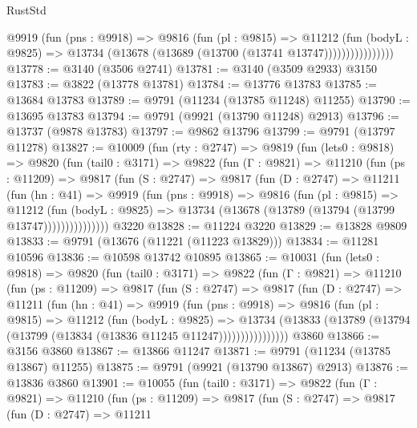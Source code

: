 \begin{lexlean}{RustStd}
\begin{coremodule}
                    @9919
                      (fun (pns : @9918) =>
                      @9816
                        (fun (pl : @9815) =>
                        @11212
                          (fun (bodyL : @9825) =>
                          @13734 (@13678 (@13689 (@13700 (@13741 @13747))))))))))))))))
@13778 := @3140 (@3506 @2741)
@13781 := @3140 (@3509 @2933) @3150
@13783 := @3822 (@13778 @13781)
@13784 := @13776 @13783
@13785 := @13684 @13783
@13789 := @9791 (@11234 (@13785 @11248) @11255)
@13790 := @13695 @13783
@13794 := @9791 (@9921 (@13790 @11248) @2913)
@13796 := @13737 (@9878 @13783)
@13797 := @9862 @13796
@13799 := @9791 (@13797 @11278)
@13827 := @10009
    (fun (rty : @2747) =>
    @9819
      (fun (lets0 : @9818) =>
      @9820
        (fun (tail0 : @3171) =>
        @9822
          (fun (Γ : @9821) =>
          @11210
            (fun (ps : @11209) =>
            @9817
              (fun (S : @2747) =>
              @9817
                (fun (D : @2747) =>
                @11211
                  (fun (hn : @41) =>
                  @9919
                    (fun (pns : @9918) =>
                    @9816
                      (fun (pl : @9815) =>
                      @11212
                        (fun (bodyL : @9825) =>
                        @13734 (@13678 (@13789 (@13794 (@13799 @13747)))))))))))))))
    @3220
@13828 := @11224 @3220
@13829 := @13828 @9809
@13833 := @9791 (@13676 (@11221 (@11223 @13829)))
@13834 := @11281 @10596
@13836 := @10598 @13742 @10895
@13865 := @10031
    (fun (lets0 : @9818) =>
    @9820
      (fun (tail0 : @3171) =>
      @9822
        (fun (Γ : @9821) =>
        @11210
          (fun (ps : @11209) =>
          @9817
            (fun (S : @2747) =>
            @9817
              (fun (D : @2747) =>
              @11211
                (fun (hn : @41) =>
                @9919
                  (fun (pns : @9918) =>
                  @9816
                    (fun (pl : @9815) =>
                    @11212
                      (fun (bodyL : @9825) =>
                      @13734
                        (@13833
                          (@13789 (@13794 (@13799 (@13834 (@13836 @11245 @11247))))))))))))))))
    @3860
@13866 := @3156 @3860
@13867 := @13866 @11247
@13871 := @9791 (@11234 (@13785 @13867) @11255)
@13875 := @9791 (@9921 (@13790 @13867) @2913)
@13876 := @13836 @3860
@13901 := @10055
    (fun (tail0 : @3171) =>
    @9822
      (fun (Γ : @9821) =>
      @11210
        (fun (ps : @11209) =>
        @9817
          (fun (S : @2747) =>
          @9817
            (fun (D : @2747) =>
            @11211

\end{coremodule}
\end{lexlean}
